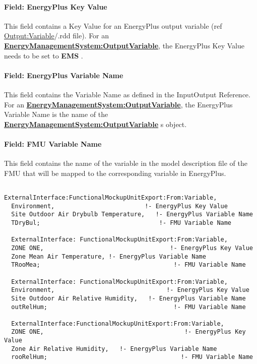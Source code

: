 \paragraph{Field: EnergyPlus Key Value}\label{field-energyplus-key-value-1}

This field contains a Key Value for an EnergyPlus output variable (ref \hyperref[outputvariable]{Output:Variable}/.rdd file). For an \textbf{\hyperref[energymanagementsystemoutputvariable]{EnergyManagementSystem:OutputVariable}}, the EnergyPlus Key Value needs to be set to \textbf{EMS} .

\paragraph{Field: EnergyPlus Variable Name}\label{field-energyplus-variable-name-4}

This field contains the Variable Name as defined in the InputOutput Reference. For an \textbf{\hyperref[energymanagementsystemoutputvariable]{EnergyManagementSystem:OutputVariable}}, the EnergyPlus Variable Name is the name of the \textbf{\hyperref[energymanagementsystemoutputvariable]{EnergyManagementSystem:OutputVariable}} s object.

\paragraph{Field: FMU Variable Name}\label{field-fmu-variable-name-4}

This field contains the name of the variable in the model description file of the FMU that will be mapped to the corresponding variable in EnergyPlus.

\begin{lstlisting}

ExternalInterface:FunctionalMockupUnitExport:From:Variable,
  Environment,                         !- EnergyPlus Key Value
  Site Outdoor Air Drybulb Temperature,   !- EnergyPlus Variable Name
  TDryBul;                                 !- FMU Variable Name

  ExternalInterface: FunctionalMockupUnitExport:From:Variable,
  ZONE ONE,                                   !- EnergyPlus Key Value
  Zone Mean Air Temperature, !- EnergyPlus Variable Name
  TRooMea;                                     !- FMU Variable Name

  ExternalInterface: FunctionalMockupUnitExport:From:Variable,
  Environment,                               !- EnergyPlus Key Value
  Site Outdoor Air Relative Humidity,   !- EnergyPlus Variable Name
  outRelHum;                                   !- FMU Variable Name

  ExternalInterface:FunctionalMockupUnitExport:From:Variable,
  ZONE ONE,                                       !- EnergyPlus Key Value
  Zone Air Relative Humidity,   !- EnergyPlus Variable Name
  rooRelHum;                                     !- FMU Variable Name
\end{lstlisting}

